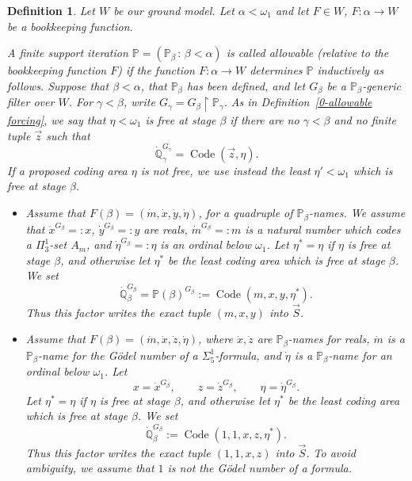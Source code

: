 \documentclass[a4paper,11pt]{article}
\newtheorem{definition}[theorem]{Definition}
\newcommand{\forceP}{\mathbb{P}}
\newcommand{\forceQ}{\mathbb{Q}}
\begin{document}
\begin{definition}
    
    Let $W$ be our ground model. Let $\alpha < \omega_1$ and let $F\in W$, $F: \alpha \rightarrow W$ be a bookkeeping function.
    
    A finite support iteration $\forceP=(\forceP_{\beta}\,:\, {\beta< \alpha})$ is called allowable (relative to the bookkeeping function $F$) if the function $F: \alpha \rightarrow W$ determines $\forceP$ inductively as follows. Suppose that $\beta<\alpha$, that $\forceP_\beta$ has been defined, and let $G_\beta$ be a $\forceP_\beta$-generic filter over $W$. For $\gamma<\beta$, write $G_\gamma=G_\beta\upharpoonright\forceP_\gamma$. As in Definition~\ref{0-allowable forcing}, we say that $\eta<\omega_1$ is \emph{free at stage $\beta$} if there are no $\gamma<\beta$ and no finite tuple $\vec z$ such that
    \[
    \dot{\forceQ}_\gamma^{G_\gamma}=\operatorname{Code}(\vec z,\eta).
    \]
    If a proposed coding area $\eta$ is not free, we use instead the least $\eta'<\omega_1$ which is free at stage $\beta$.
    
     \begin{itemize}
    
     \item[(1)] Assume that $F(\beta)=(\dot{m}, \dot{x}, \dot{y},\dot{\eta})$, for a quadruple of $\forceP_{\beta}$-names. We assume that $\dot{x}^{G_{\beta}}=:x$, $\dot{y}^{G_{\beta}}=:y$ are reals, $\dot{m}^{G_{\beta}}=:m$ is a natural number which codes a $\Pi^1_3$-set $A_m$, and $\dot{\eta}^{G_{\beta}}=: \eta$ is an ordinal below $\omega_1$. Let $\eta^*=\eta$ if $\eta$ is free at stage $\beta$, and otherwise let $\eta^*$ be the least coding area which is free at stage $\beta$. We set
     \[
     \dot{\forceQ}_{\beta}^{G_{\beta}}=\forceP(\beta)^{G_{\beta}}:= \operatorname{Code}(m,x,y,\eta^*).
     \]
     Thus this factor writes the exact tuple $(m,x,y)$ into $\vec S$.
    
     \item[(2)] Assume that $F(\beta)=(\dot{m},\dot{x},\dot{z},\dot{\eta})$, where $\dot{x},\dot{z}$ are $\forceP_\beta$-names for reals, $\dot{m}$ is a $\forceP_\beta$-name for the G\"odel number of a $\Sigma^1_5$-formula, and $\dot{\eta}$ is a $\forceP_\beta$-name for an ordinal below $\omega_1$. Let
     \[
     x=\dot{x}^{G_\beta},\qquad z=\dot{z}^{G_\beta},\qquad \eta=\dot{\eta}^{G_\beta}.
     \]
     Let $\eta^*=\eta$ if $\eta$ is free at stage $\beta$, and otherwise let $\eta^*$ be the least coding area which is free at stage $\beta$. We set
     \[
     \dot{\forceQ}_{\beta}^{G_{\beta}}:=\operatorname{Code}(1,1,x,z,\eta^*).
     \]
     Thus this factor writes the exact tuple $(1,1,x,z)$ into $\vec S$. To avoid ambiguity, we assume that $1$ is not the G\"odel number of a formula.


\end{itemize}
\end{definition}
\end{document}
